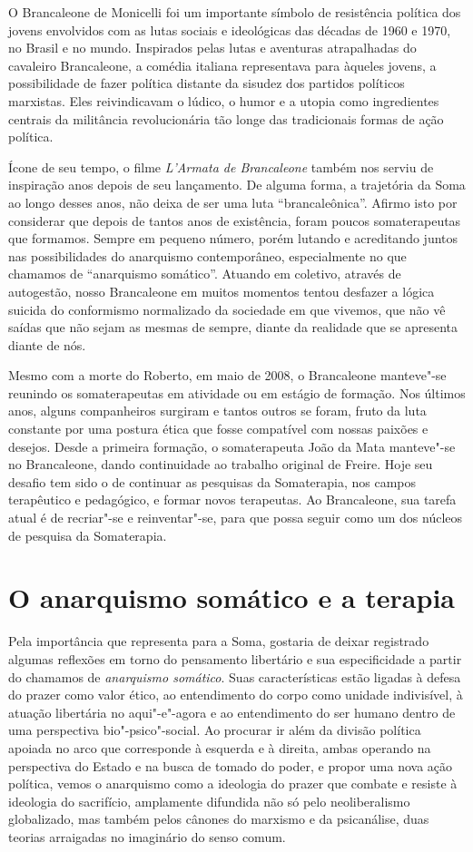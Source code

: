 O Brancaleone de Monicelli foi um importante símbolo de resistência
política dos jovens envolvidos com as lutas sociais e ideológicas das
décadas de 1960 e 1970, no Brasil e no mundo. Inspirados pelas lutas e
aventuras atrapalhadas do cavaleiro Brancaleone, a comédia italiana
representava para àqueles jovens, a possibilidade de fazer política
distante da sisudez dos partidos políticos marxistas. Eles reivindicavam
o lúdico, o humor e a utopia como ingredientes centrais da militância
revolucionária tão longe das tradicionais formas de ação política.

Ícone de seu tempo, o filme \emph{L'Armata de Brancaleone} também nos
serviu de inspiração anos depois de seu lançamento. De alguma forma, a
trajetória da Soma ao longo desses anos, não deixa de ser uma luta
``brancaleônica''. Afirmo isto por considerar que depois de tantos anos
de existência, foram poucos somaterapeutas que formamos. Sempre em
pequeno número, porém lutando e acreditando juntos nas possibilidades do
anarquismo contemporâneo, especialmente no que chamamos de ``anarquismo
somático''. Atuando em coletivo, através de autogestão, nosso
Brancaleone em muitos momentos tentou desfazer a lógica suicida do
conformismo normalizado da sociedade em que vivemos, que não vê saídas
que não sejam as mesmas de sempre, diante da realidade que se apresenta
diante de nós.

Mesmo com a morte do Roberto, em maio de 2008, o Brancaleone manteve"-se
reunindo os somaterapeutas em atividade ou em estágio de formação. Nos
últimos anos, alguns companheiros surgiram e tantos outros se foram,
fruto da luta constante por uma postura ética que fosse compatível com
nossas paixões e desejos. Desde a primeira formação, o somaterapeuta
João da Mata manteve"-se no Brancaleone, dando continuidade ao trabalho
original de Freire. Hoje seu desafio tem sido o de continuar as
pesquisas da Somaterapia, nos campos terapêutico e pedagógico, e formar
novos terapeutas. Ao Brancaleone, sua tarefa atual é de recriar"-se e
reinventar"-se, para que possa seguir como um dos núcleos de pesquisa da
Somaterapia.

\section{O anarquismo somático e a terapia}

Pela importância que representa para a Soma, gostaria de deixar
registrado algumas reflexões em torno do pensamento libertário e sua
especificidade a partir do chamamos de \emph{anarquismo somático}. Suas
características estão ligadas à defesa do prazer como valor ético, ao
entendimento do corpo como unidade indivisível, à atuação libertária no
aqui"-e"-agora e ao entendimento do ser humano dentro de uma perspectiva
bio"-psico"-social. Ao procurar ir além da divisão política apoiada no
arco que corresponde à esquerda e à direita, ambas operando na
perspectiva do Estado e na busca de tomado do poder, e propor uma nova
ação política, vemos o anarquismo como a ideologia do prazer que combate
e resiste à ideologia do sacrifício, amplamente difundida não só pelo
neoliberalismo globalizado, mas também pelos cânones do marxismo e da
psicanálise, duas teorias arraigadas no imaginário do senso comum.

